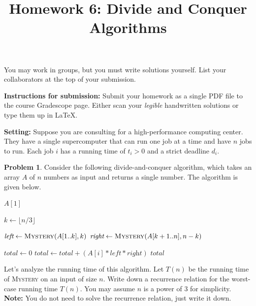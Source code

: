 \documentclass[10pt]{article}
\title{Homework 6: Divide and Conquer Algorithms}
\date{}
\theoremstyle{definition}
\newtheorem{problem}{Problem}
\begin{document}
\maketitle
\thispagestyle{fancy}

\noindent You may work in groups, but you must write solutions yourself. List your collaborators at the top of your submission. 

\vspace{1em}

\noindent \textbf{Instructions for submission:} Submit your homework as a single PDF file to the course Gradescope page. Either scan your \emph{legible} handwritten solutions or type them up in \LaTeX. 

\vspace{5pt}
\noindent \textbf{Setting:} Suppose you are consulting for a high-performance computing center. They have a single supercomputer that can run one job at a time and have $n$ jobs to run. Each job $i$ has a running time of $t_i > 0$ and a strict deadline $d_i$.  

\begin{problem}

    Consider the following divide-and-conquer algorithm, which takes an array $A$ of $n$ numbers as input and returns a single number. The algorithm is given below.

    \begin{algorithm}
    \caption{Mystery Divide-and-Conquer Algorithm}
    \begin{algorithmic}[1]
            \State \Return $A[1]$ 
        \EndIf
        
        \State $\textit{k} \gets \lfloor n / 3 \rfloor$ 
        \Statex

        \State $\textit{left} \gets \textsc{Mystery}(A[1..k], k)$ 
        \State $\textit{right} \gets \textsc{Mystery}(A[k+1..n], n-k)$ 
        \Statex

        \State $\textit{total} \gets 0$ 
            \State $\textit{total} \gets \textit{total} + (A[i] * \textit{left} * \textit{right})$ 
        \EndFor
        \State \Return $\textit{total}$
    \EndProcedure
    \end{algorithmic}
    \end{algorithm}
    
    \noindent Let's analyze the running time of this algorithm. Let $T(n)$ be the running time of \textsc{Mystery} on an input of size $n$. Write down a recurrence relation for the worst-case running time $T(n)$. You may assume $n$ is a power of 3 for simplicity. \textbf{Note:} You do not need to solve the recurrence relation, just write it down.
\end{problem}
\end{document}
